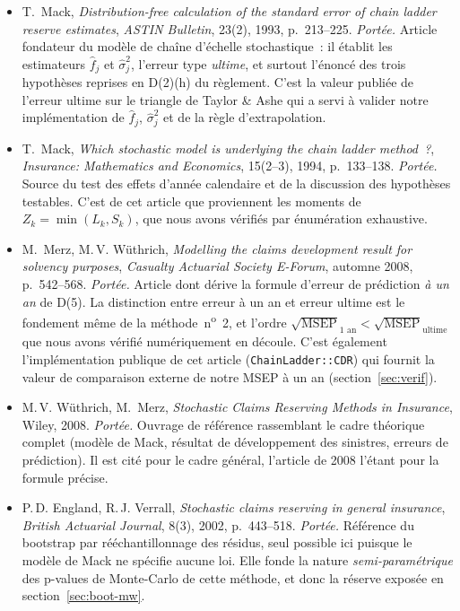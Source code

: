 \documentclass[a4paper,11pt]{article}
\newcommand{\code}[1]{\texttt{\small #1}}
\begin{document}
\begin{itemize}[itemsep=4pt]
  \item T.~Mack, \emph{Distribution-free calculation of the standard error of
  chain ladder reserve estimates}, \emph{ASTIN Bulletin}, 23(2), 1993,
  p.~213--225.
  \emph{Portée.} Article fondateur du modèle de chaîne d'échelle stochastique~:
  il établit les estimateurs $\hat f_j$ et $\hat\sigma_j^2$, l'erreur type
  \emph{ultime}, et surtout l'énoncé des trois hypothèses reprises en
  D(2)(h) du règlement. C'est la valeur publiée de l'erreur ultime sur
  le triangle de Taylor \& Ashe qui a servi à valider notre implémentation de
  $\hat f_j$, $\hat\sigma_j^2$ et de la règle d'extrapolation.

  \item T.~Mack, \emph{Which stochastic model is underlying the chain ladder
  method~?}, \emph{Insurance: Mathematics and Economics}, 15(2--3), 1994,
  p.~133--138.
  \emph{Portée.} Source du test des effets d'année calendaire et de la
  discussion des hypothèses testables. C'est de cet article que proviennent les
  moments de $Z_k = \min(L_k, S_k)$, que nous avons vérifiés par énumération
  exhaustive.

  \item M.~Merz, M.\,V. Wüthrich, \emph{Modelling the claims development result
  for solvency purposes}, \emph{Casualty Actuarial Society E-Forum}, automne
  2008, p.~542--568.
  \emph{Portée.} Article dont dérive la formule d'erreur de prédiction \emph{à un
  an} de D(5). La distinction entre erreur à un an et erreur ultime
  est le fondement même de la méthode~n\textsuperscript{o}~2, et l'ordre
  $\sqrt{\mathrm{MSEP}}_{\text{1 an}} < \sqrt{\mathrm{MSEP}}_{\text{ultime}}$ que
  nous avons vérifié numériquement en découle. C'est également l'implémentation
  publique de cet article (\code{ChainLadder::CDR}) qui fournit la valeur de
  comparaison externe de notre MSEP à un an (section~\ref{sec:verif}).

  \item M.\,V. Wüthrich, M.~Merz, \emph{Stochastic Claims Reserving Methods in
  Insurance}, Wiley, 2008.
  \emph{Portée.} Ouvrage de référence rassemblant le cadre théorique complet
  (modèle de Mack, résultat de développement des sinistres, erreurs de
  prédiction). Il est cité pour le cadre général, l'article de 2008 l'étant pour
  la formule précise.

  \item P.\,D. England, R.\,J. Verrall, \emph{Stochastic claims reserving in
  general insurance}, \emph{British Actuarial Journal}, 8(3), 2002, p.~443--518.
  \emph{Portée.} Référence du bootstrap par rééchantillonnage des résidus, seul
  possible ici puisque le modèle de Mack ne spécifie aucune loi. Elle fonde la
  nature \emph{semi-paramétrique} des p-values de Monte-Carlo de cette méthode,
  et donc la réserve exposée en section~\ref{sec:boot-mw}.


\end{itemize}
\end{document}
